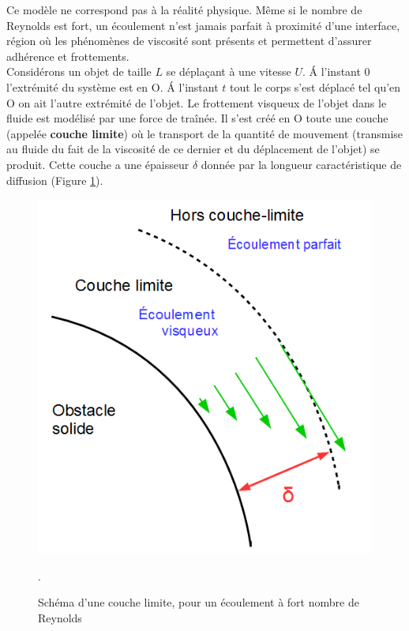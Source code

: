 \documentclass[11pt,a4paper]{report}
\begin{document}
Ce modèle ne correspond pas à la réalité physique. Même si le nombre de Reynolds est fort, un écoulement n'est jamais parfait à proximité d'une interface, région où les phénomènes de viscosité sont présents et permettent d'assurer adhérence et frottements.\\

Considérons un objet de taille $L$ se déplaçant à une vitesse $U$. \'A l’instant $0$ l’extrémité du système est en O. 
\'A l’instant $t$ tout le corps s’est déplacé tel qu’en O on ait l’autre extrémité de l’objet. Le frottement visqueux de l'objet dans le fluide est modélisé par une force de traînée. Il s’est créé en O toute une couche (appelée \textbf{couche limite}) où le transport de la quantité de mouvement (transmise au fluide du fait de la viscosité de ce dernier et du déplacement de l'objet) se produit. Cette couche a une épaisseur $\delta$ donnée par la longueur caractéristique de diffusion (Figure \ref{fig:couche_limite}).

\begin{figure}[h!]
\begin{center}
	\includegraphics[scale = 0.3]{couche_limite.png}
	\caption{Schéma d'une couche limite, pour un écoulement à fort nombre de Reynolds}. 
	\label{fig:couche_limite}
\end{center}
\end{figure}
\end{document}
